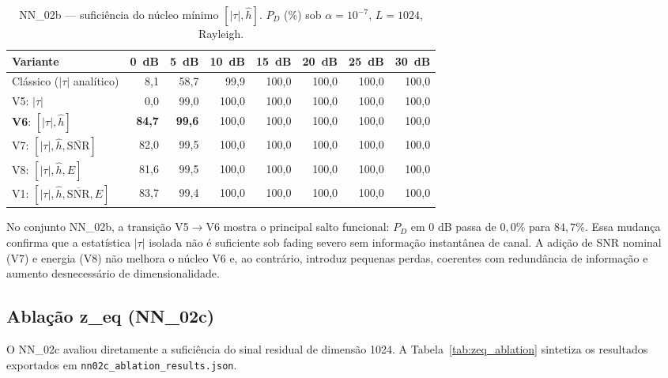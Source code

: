 \documentclass[12pt,a4paper]{article}
\begin{document}
\begin{table}[htb]
\caption{\label{tab:feat_ablation}NN\_02b --- suficiência do núcleo mínimo $[|\tau|,\hat{h}]$. $P_D$ (\%) sob $\alpha=10^{-7}$, $L=1024$, Rayleigh.}
\begin{center}
{\footnotesize
\begin{tabular}{lrrrrrrr}\toprule
Variante & 0~dB & 5~dB & 10~dB & 15~dB & 20~dB & 25~dB & 30~dB \\\midrule
Clássico ($|\tau|$ analítico)                &  8{,}1 & 58{,}7 & 99{,}9 & 100{,}0 & 100{,}0 & 100{,}0 & 100{,}0 \\\midrule
V5: $|\tau|$                                  &  0{,}0 & 99{,}0 & 100{,}0 & 100{,}0 & 100{,}0 & 100{,}0 & 100{,}0 \\
\textbf{V6}: $[|\tau|,\hat{h}]$              & \textbf{84{,}7} & \textbf{99{,}6} & 100{,}0 & 100{,}0 & 100{,}0 & 100{,}0 & 100{,}0 \\
V7: $[|\tau|,\hat{h},\overline{\text{SNR}}]$ & 82{,}0 & 99{,}5 & 100{,}0 & 100{,}0 & 100{,}0 & 100{,}0 & 100{,}0 \\
V8: $[|\tau|,\hat{h},E]$                      & 81{,}6 & 99{,}5 & 100{,}0 & 100{,}0 & 100{,}0 & 100{,}0 & 100{,}0 \\
V1: $[|\tau|,\hat{h},\overline{\text{SNR}},E]$ & 83{,}7 & 99{,}4 & 100{,}0 & 100{,}0 & 100{,}0 & 100{,}0 & 100{,}0 \\\bottomrule
\end{tabular}
}
\end{center}
\end{table}

No conjunto NN\_02b, a transição V5$\to$V6 mostra o principal salto funcional: $P_D$ em 0 dB passa de $0{,}0\%$ para $84{,}7\%$. Essa mudança confirma que a estatística $|\tau|$ isolada não é suficiente sob fading severo sem informação instantânea de canal. A adição de SNR nominal (V7) e energia (V8) não melhora o núcleo V6 e, ao contrário, introduz pequenas perdas, coerentes com redundância de informação e aumento desnecessário de dimensionalidade.

\subsection{Ablação z\_eq (NN\_02c)}

O NN\_02c avaliou diretamente a suficiência do sinal residual de dimensão 1024. A Tabela~\ref{tab:zeq_ablation} sintetiza os resultados exportados em \texttt{nn02c\_ablation\_results.json}.
\end{document}
